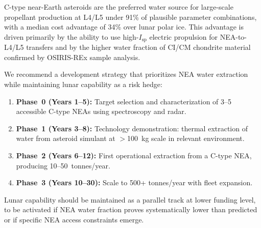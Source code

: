 \documentclass[preprint,12pt]{elsarticle}
\begin{document}
C-type near-Earth asteroids are the preferred water source for large-scale propellant production at L4/L5 under 91\% of plausible parameter combinations, with a median cost advantage of 34\% over lunar polar ice. This advantage is driven primarily by the ability to use high-$I_\text{sp}$ electric propulsion for NEA-to-L4/L5 transfers and by the higher water fraction of CI/CM chondrite material confirmed by OSIRIS-REx sample analysis.

We recommend a development strategy that prioritizes NEA water extraction while maintaining lunar capability as a risk hedge:
\begin{enumerate}
    \item \textbf{Phase~0 (Years 1--5):} Target selection and characterization of 3--5 accessible C-type NEAs using spectroscopy and radar.
    \item \textbf{Phase~1 (Years 3--8):} Technology demonstration: thermal extraction of water from asteroid simulant at $>$100~kg scale in relevant environment.
    \item \textbf{Phase~2 (Years 6--12):} First operational extraction from a C-type NEA, producing 10--50~tonnes/year.
    \item \textbf{Phase~3 (Years 10--30):} Scale to 500+ tonnes/year with fleet expansion.
\end{enumerate}

Lunar capability should be maintained as a parallel track at lower funding level, to be activated if NEA water fraction proves systematically lower than predicted or if specific NEA access constraints emerge.

\end{document}
